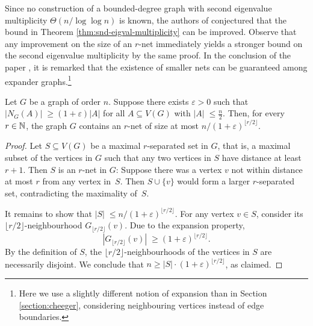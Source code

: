 Since no construction of a bounded-degree graph with second eigenvalue multiplicity \sloppy $\Theta(n / \log \log n)$ is known, the authors of \cite{equiangular} conjectured that the bound in Theorem \ref{thm:snd-eigval-multiplicity} can be improved.
Observe that any improvement on the size of an $r$-net immediately yields a stronger bound on the second eigenvalue multiplicity by the same proof. 
In the conclusion of the paper \cite{equiangular}, it is remarked that the existence of smaller nets can be guaranteed among expander graphs.\footnote{Here we use a slightly different notion of expansion than in Section \ref{section:cheeger}, considering neighbouring vertices instead of edge boundaries.}



\begin{lemma}
    Let $G$ be a graph of order $n$.
    Suppose there exists $\varepsilon > 0$ such that $|N_G(A)|\; \ge (1 + \varepsilon) |A|$ for all $A \subseteq V(G)$ with $|A|\; \le \frac{n}{2}$.
    Then, for every $r \in \mathbb{N}$, the graph $G$ contains an $r$-net of size at most \mbox{$n / (1 + \varepsilon)^{\lfloor r / 2 \rfloor}$}.
\end{lemma}

\begin{proof}
    Let $S \subseteq V(G)$ be a maximal $r$-separated set in $G$, that is, a maximal subset of the vertices in $G$ such that any two vertices in $S$ have distance at least $r + 1$.
    Then $S$ is an $r$-net in $G$: Suppose there was a vertex $v$ not within distance at most $r$ from any vertex \mbox{in $S$}. 
    Then $S \cup \{ v\}$ would form a larger $r$-separated set, contradicting the maximality \mbox{of $S$}.

    It remains to show that $|S|\; \le n / (1 + \varepsilon)^{\lfloor r / 2 \rfloor}$.
    For any vertex $v \in S$, consider its $\lfloor r /2 \rfloor$-neighbourhood $G_{\lfloor r /2 \rfloor} (v)$.
    Due to the expansion property, 
    \begin{equation*}
        |G_{\lfloor r /2 \rfloor} (v)|\; \ge (1 + \varepsilon) ^{{\lfloor r / 2 \rfloor}}.
    \end{equation*}
    By the definition of $S$, the ${\lfloor r / 2 \rfloor}$-neighbourhoods of the vertices in $S$ are necessarily disjoint.
    We conclude that $n \ge |S| \cdot (1 + \varepsilon) ^{{\lfloor r / 2 \rfloor}}$, as claimed.
\end{proof}

